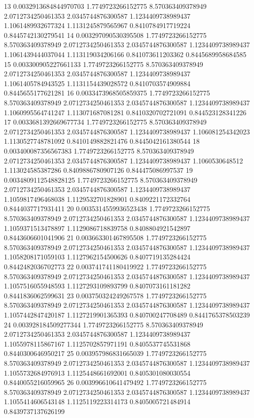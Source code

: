 {13 0.0032913684844970703 1.7749723266152775 8.570363409378949 2.0712734250461353 2.0345744876300587 1.1234409738989437 1.1061489932677324 1.1131245879565967 0.8410784917719224 0.8445742130279541
14 0.003297090530395508 1.7749723266152775 8.570363409378949 2.0712734250461353 2.0345744876300587 1.1234409738989437 1.1061439444037044 1.113119034206166 0.841073611203362 0.8445689958684585
15 0.003300905227661133 1.7749723266152775 8.570363409378949 2.0712734250461353 2.0345744876300587 1.1234409738989437 1.1061405784943525 1.1131154439028572 0.8410703574909884 0.8445655177621281
16 0.0033473968505859375 1.7749723266152775 8.570363409378949 2.0712734250461353 2.0345744876300587 1.1234409738989437 1.1060995564741247 1.113071687081281 0.8410320702721091 0.844523128341226
17 0.0033681392669677734 1.7749723266152775 8.570363409378949 2.0712734250461353 2.0345744876300587 1.1234409738989437 1.106081254342023 1.1130527748781092 0.8410149882821476 0.8445042161380544
18 0.003400087356567383 1.7749723266152775 8.570363409378949 2.0712734250461353 2.0345744876300587 1.1234409738989437 1.1060530648512 1.113024585387286 0.8409886780907126 0.844475086997537
19 0.0034809112548828125 1.7749723266152775 8.570363409378949 2.0712734250461353 2.0345744876300587 1.1234409738989437 1.1059817496468038 1.1129532701828901 0.8409221172332764 0.8444037717931411
20 0.0035314559936523438 1.7749723266152775 8.570363409378949 2.0712734250461353 2.0345744876300587 1.1234409738989437 1.1059371513478897 1.1129086718839758 0.8408804921542897 0.8443606601041906
21 0.003663301467895508 1.7749723266152775 8.570363409378949 2.0712734250461353 2.0345744876300587 1.1234409738989437 1.1058208171059103 1.1127962154500626 0.8407719135284424 0.8442482036702773
22 0.003741741180419922 1.7749723266152775 8.570363409378949 2.0712734250461353 2.0345744876300587 1.1234409738989437 1.1057516055948593 1.1127293109893799 0.8407073161181282 0.8441836062599631
23 0.003750324249267578 1.7749723266152775 8.570363409378949 2.0712734250461353 2.0345744876300587 1.1234409738989437 1.1057442847420187 1.1127219901365393 0.840700247708489 0.8441765378503239
24 0.003928184509277344 1.7749723266152775 8.570363409378949 2.0712734250461353 2.0345744876300587 1.1234409738989437 1.1055978115867167 1.1125702857971191 0.8405537745531868 0.8440300646950217
25 0.003957986831665039 1.7749723266152775 8.570363409378949 2.0712734250461353 2.0345744876300587 1.1234409738989437 1.1055732684976913 1.1125448661692001 0.8405301080030554 0.8440055216059965
26 0.003996610641479492 1.7749723266152775 8.570363409378949 2.0712734250461353 2.0345744876300587 1.1234409738989437 1.1055414606543148 1.1125119223314173 0.8405005721484914 0.8439737137626199
}
